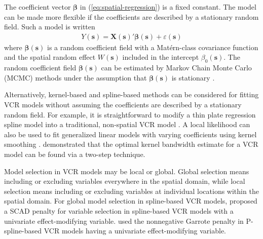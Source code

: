 \documentclass[authoryear, review, 11pt]{elsarticle}
\begin{document}
	The coefficient vector $\bm{\beta}$ in (\ref{eq:spatial-regression}) is a fixed constant. The model can be made more flexible if the coefficients are described by a stationary random field. Such a model is written
\begin{align}\label{eq:SVCR-process}
    Y(\bm{s}) = \bm{X}(\bm{s})'\bm{\beta}(\bm{s}) + \varepsilon(\bm{s})
\end{align}
	where $\bm{\beta}(\bm{s})$ is a random coefficient field with a Mat\'{e}rn-class covariance function and the spatial random effect $W(\bm{s})$ included in the intercept $\beta_0(\bm{s})$. The random coefficient field $\bm{\beta}(\bm{s})$ can be estimated by Markov Chain Monte Carlo (MCMC) methods under the assumption that $\bm{\beta}(\bm{s})$ is stationary \citep{Gelfand:2003}.


	Alternatively, kernel-based and spline-based methods can be considered for fitting VCR models without assuming the coefficients are described by a stationary random field. For example, it is straightforward to modify a thin plate regression spline model into a traditional, non-spatial VCR model \citep{Wood:2006}. A local likelihood can also be used to fit generalized linear models with varying coefficients using kernel smoothing \citep{Loader:1999}. \cite{Fan:1999} demonstrated that the optimal kernel bandwidth estimate for a VCR model can be found via a two-step technique.
	
	Model selection in VCR models may be local or global. Global selection means including or excluding variables everywhere in the spatial domain, while local selection means including or excluding variables at individual locations within the spatial domain. For global model selection in spline-based VCR models, \cite{Wang:2008a} proposed a SCAD penalty \citep{Fan:2001} for variable selection in spline-based VCR models with a univariate effect-modifying variable. \cite{Antoniadis:2012a} used the nonnegative Garrote penalty \citep{Breiman:1995} in P-spline-based VCR models having a univariate effect-modifying variable.
	
\end{document}
